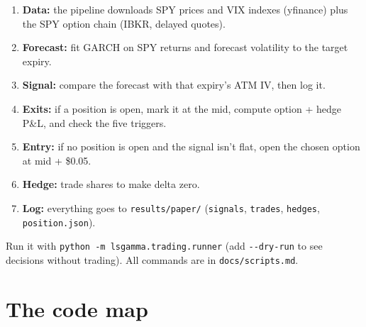 \documentclass{article}
\begin{document}
\begin{enumerate}

\item \textbf{Data:} the pipeline downloads SPY prices and VIX indexes (yfinance) plus the SPY option chain (IBKR, delayed quotes).

\item \textbf{Forecast:} fit GARCH on SPY returns and forecast volatility to the target expiry.

\item \textbf{Signal:} compare the forecast with that expiry's ATM IV, then log it.

\item \textbf{Exits:} if a position is open, mark it at the mid, compute option + hedge P\&L, and check the five triggers.

\item \textbf{Entry:} if no position is open and the signal isn't flat, open the chosen option at mid + \$0.05.

\item \textbf{Hedge:} trade shares to make delta zero.

\item \textbf{Log:} everything goes to \texttt{results/\allowbreak{}paper/\allowbreak{}} (\texttt{signals}, \texttt{trades}, \texttt{hedges}, \texttt{position.\allowbreak{}json}).

\end{enumerate}

Run it with \texttt{python -\allowbreak{}m lsgamma.\allowbreak{}trading.\allowbreak{}runner} (add \texttt{-\allowbreak{}-\allowbreak{}dry-\allowbreak{}run} to see decisions without trading). All commands are in \texttt{docs/\allowbreak{}scripts.\allowbreak{}md}.

\section{The code map}
\end{document}
